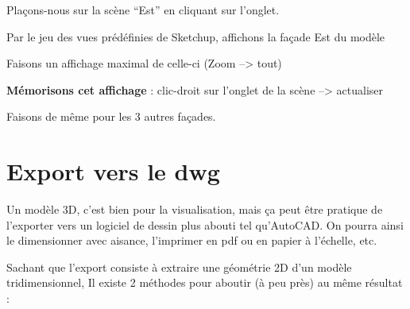 \documentclass[a4paper,12pt,french]{sphinxmanual}
\begin{document}
Plaçons-nous sur la scène ``Est'' en cliquant sur l'onglet.

Par le jeu des vues prédéfinies de Sketchup, affichons la façade Est du modèle

Faisons un affichage maximal de celle-ci (Zoom --\textgreater{} tout)

\textbf{Mémorisons cet affichage} : clic-droit sur l'onglet de la scène --\textgreater{} actualiser

Faisons de même pour les 3 autres façades.


\section{Export vers le dwg}
\label{su/export-dwg:export-vers-le-dwg}\label{su/export-dwg::doc}\label{su/export-dwg:export-dwg}
Un modèle 3D, c'est bien pour la visualisation, mais ça peut être pratique de l'exporter vers un logiciel de dessin plus abouti tel qu'AutoCAD. On pourra ainsi le dimensionner avec aisance, l'imprimer en pdf ou en papier à l'échelle, etc.

Sachant que l'export consiste à extraire une géométrie 2D d'un modèle tridimensionnel, Il existe 2 méthodes pour aboutir (à peu près) au même résultat :
\begin{figure}[htbp]
\centering

\noindent{}
\end{figure}
\end{document}
